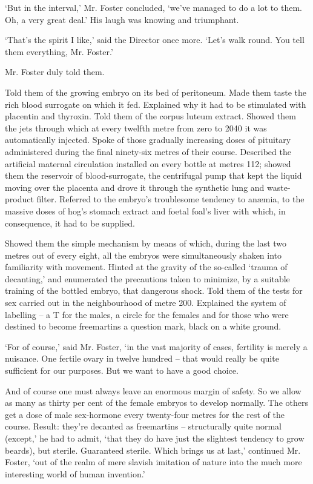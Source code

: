 \documentclass[12pt,a5paper]{book}
\newcommand{\sqm}[1]{‘#1’}
\begin{document}
\sqm{But in the interval,} Mr. Foster concluded, \sqm{we've managed to do a lot to them. Oh, a very great deal.} His laugh was knowing and triumphant.

\sqm{That's the spirit I like,} said the Director once more. \sqm{Let's walk round. You tell them everything, Mr. Foster.}

Mr. Foster duly told them.

Told them of the growing embryo on its bed of peritoneum. Made them taste the rich blood surrogate on which it fed. Explained why it had to be stimulated with placentin and thyroxin. Told them of the corpus luteum extract. Showed them the jets through which at every twelfth metre from zero to 2040 it was automatically injected. Spoke of those gradually increasing doses of pituitary administered during the final ninety-six metres of their course. Described the artificial maternal circulation installed on every bottle at metres 112; showed them the reservoir of blood-surrogate, the centrifugal pump that kept the liquid moving over the placenta and drove it through the synthetic lung and waste-product filter. Referred to the embryo's troublesome tendency to anæmia, to the massive doses of hog's stomach extract and foetal foal's liver with which, in consequence, it had to be supplied.

Showed them the simple mechanism by means of which, during the last two metres out of every eight, all the embryos were simultaneously shaken into familiarity with movement. Hinted at the gravity of the so-called \sqm{trauma of decanting,} and enumerated the precautions taken to minimize, by a suitable training of the bottled embryo, that dangerous shock. Told them of the tests for sex carried out in the neighbourhood of metre 200. Explained the system of labelling – a T for the males, a circle for the females and for those who were destined to become freemartins a question mark, black on a white ground.

\sqm{For of course,} said Mr. Foster, \sqm{in the vast majority of cases, fertility is merely a nuisance. One fertile ovary in twelve hundred – that would really be quite sufficient for our purposes. But we want to have a good choice.

And of course one must always leave an enormous margin of safety. So we allow as many as thirty per cent of the female embryos to develop normally. The others get a dose of male sex-hormone every twenty-four metres for the rest of the course. Result: they're decanted as freemartins – structurally quite normal (except,} he had to admit, \sqm{that they do have just the slightest tendency to grow beards), but sterile. Guaranteed sterile. Which brings us at last,} continued Mr. Foster, \sqm{out of the realm of mere slavish imitation of nature into the much more interesting world of human invention.}
\end{document}
